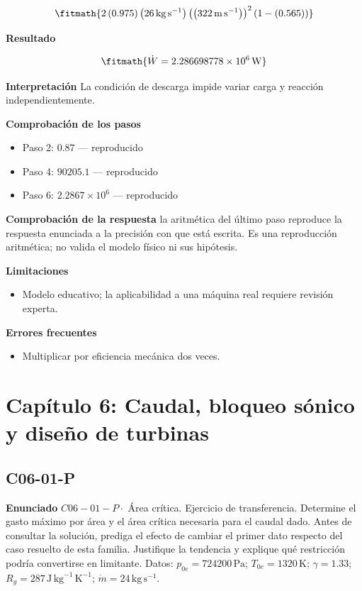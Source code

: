 \documentclass[10pt,openany]{book}
\begin{document}
\[
\fitmath{2 \left(0.975\right) \left(26\,\mathrm{kg}\,\mathrm{s}^{-1}\right) \left(\left(322\,\mathrm{m}\,\mathrm{s}^{-1}\right)\right)^{2} \left(1 - \left(0.565\right)\right)}
\]

\noindent\textbf{Resultado}

\[
\fitmath{\dot{W}=2.286698778\times10^{6}\,\mathrm{W}}
\]

\noindent\textbf{Interpretación}
La condición de descarga impide variar carga y reacción independientemente.

\noindent\textbf{Comprobación de los pasos}
\begin{itemize}
\item Paso 2: $0.87$ — reproducido
\item Paso 4: $90205.1$ — reproducido
\item Paso 6: $2.2867\times 10^{6}$ — reproducido
\end{itemize}

\noindent\textbf{Comprobación de la respuesta} la aritmética del último paso reproduce la respuesta enunciada a la precisión con que está escrita. Es una reproducción aritmética; no valida el modelo físico ni sus hipótesis.

\noindent\textbf{Limitaciones}
\begin{itemize}
\item Modelo educativo; la aplicabilidad a una máquina real requiere revisión experta.
\end{itemize}

\noindent\textbf{Errores frecuentes}
\begin{itemize}
\item Multiplicar por eficiencia mecánica dos veces.
\end{itemize}
\section{Capítulo 6: Caudal, bloqueo sónico y diseño de turbinas}
\subsection*{C06-01-P}

\noindent\textbf{Enunciado}
\(C06-01-P \cdot\) Área crítica. Ejercicio de transferencia. Determine el gasto máximo por área y el área crítica necesaria para el caudal dado. Antes de consultar la solución, prediga el efecto de cambiar el primer dato respecto del caso resuelto de esta familia. Justifique la tendencia y explique qué restricción podría convertirse en limitante. Datos: \(p_{0e}=724200\, \mathrm{Pa}\); \(T_{0e}=1320\, \mathrm{K}\); \(\gamma=1.33\); \(R_g=287\, \mathrm{J}\,\mathrm{kg}^{-1}\,\mathrm{K}^{-1}\); \(\dot m=24\, \mathrm{kg}\,\mathrm{s}^{-1}\).
\end{document}
